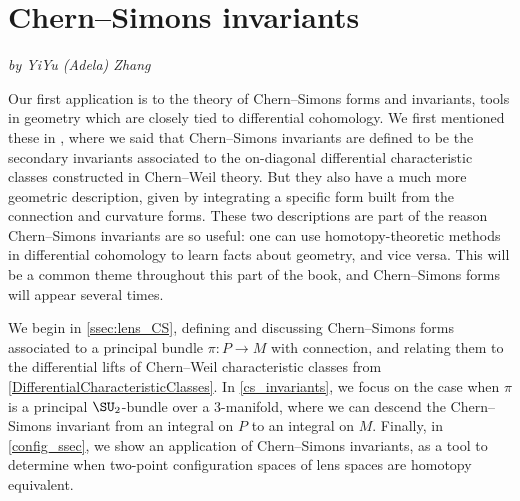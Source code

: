 
\section{Chern--Simons invariants}
\textit{by YiYu (Adela) Zhang}
\label{config_spaces}


Our first application is to the theory of Chern--Simons forms and invariants, tools in geometry which are closely
tied to differential cohomology. We first mentioned these in , where we said that
Chern--Simons invariants are defined to be the secondary invariants associated to the on-diagonal differential
characteristic classes constructed in Chern--Weil theory. But they also have a much more geometric description,
given by integrating a specific form built from the connection and curvature forms. These two descriptions are part
of the reason Chern--Simons invariants are so useful: one can use homotopy-theoretic methods in differential
cohomology to learn facts about geometry, and vice versa. This will be a common theme throughout this part of the
book, and Chern--Simons forms will appear several times.

We begin in \cref{ssec:lens_CS}, defining and discussing Chern--Simons forms associated to a principal bundle
$\pi\colon P\to M$ with connection, and relating them to the differential lifts of Chern--Weil characteristic
classes from \cref{DifferentialCharacteristicClasses}. In \cref{cs_invariants}, we focus on the case when $\pi$ is
a principal $\SU_2$-bundle over a $3$-manifold, where we can descend the Chern--Simons invariant from an integral
on $P$ to an integral on $M$.  Finally, in \cref{config_ssec}, we show an application of Chern--Simons invariants,
as a tool to determine when two-point configuration spaces of lens spaces are homotopy equivalent.

